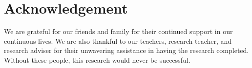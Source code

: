 \documentclass{strrespaper-journ}
\begin{document}
	\section{Acknowledgement}
		We are grateful for our friends and family for their continued support in our continuous lives.
		We are also thankful to our teachers, research teacher, and research adviser for their unwavering assistance in having the research completed.
		Without these people, this research would never be successful.

	\printbibliography
\end{document}
